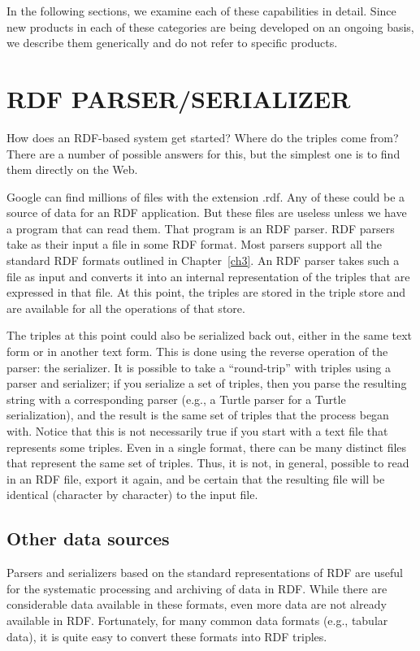 In the following sections, we examine each of these capabilities in
detail. Since new products in each of these categories are being
developed on an ongoing basis, we describe them generically and do not
refer to specific products.

\section{RDF PARSER/SERIALIZER}

How does an RDF-based system get started? Where do the triples come
from? There are a number of possible answers for this, but the simplest
one is to find them directly on the Web.

Google can find millions of files with the extension .rdf. Any of these
could be a source of data for an RDF application. But these files are
useless unless we have a program that can read them. That program is an
RDF parser. RDF parsers take as their input a file in some RDF format.
Most parsers support all the standard RDF formats outlined in Chapter~\ref{ch3}. 
An RDF parser takes such a file as input and converts it into an
internal representation of the triples that are expressed in that file.
At this point, the triples are stored in the triple store and are
available for all the operations of that store.

The triples at this point could also be serialized back out, either in
the same text form or in another text form. This is done using the
reverse operation of the parser: the serializer. It is possible to take
a ``round-trip'' with triples using a parser and serializer; if you
serialize a set of triples, then you parse the resulting string with a
corresponding parser (e.g., a Turtle parser for a Turtle serialization),
and the result is the same set of triples that the process began with.
Notice that this is not necessarily true if you start with a text file
that represents some triples. Even in a single format, there can be many
distinct files that represent the same set of triples. Thus, it is not,
in general, possible to read in an RDF file,
export it again, and be certain that the resulting file will be
identical (character by character) to the input file.

\subsection{Other data sources}

Parsers and serializers based on the standard representations of RDF are
useful for the systematic processing and archiving of data in RDF. While
there are considerable data available in these formats, even more data
are not already available in RDF. Fortunately, for many common data
formats (e.g., tabular data), it is quite easy to convert these formats
into RDF triples.

